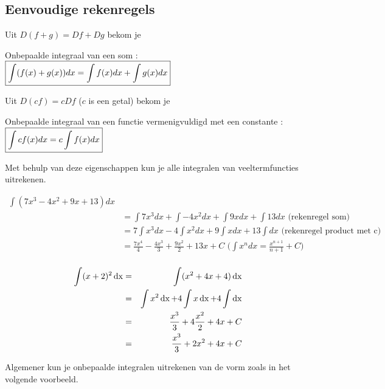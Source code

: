 \subsection{Eenvoudige rekenregels}

Uit $D(f+g)=Df+Dg$ bekom je

\begin{eigenschap} Onbepaalde integraal van een som : \\
	$\boxed { \int (f(x)+g(x))dx = \int f(x)dx + \int g(x)dx \hfill}$
\end{eigenschap}

Uit $D(cf)=cDf$ ($c$ is een getal) bekom je

\begin{eigenschap} Onbepaalde integraal van een functie vermenigvuldigd met een constante :\\
	$\boxed { \int cf(x)dx = c \int f(x)dx \hfill}$
\end{eigenschap}

Met behulp van deze eigenschappen kun je alle integralen van veeltermfuncties uitrekenen.

\begin{voorbeeld}
	\begin{equation*}
	\begin{split}
	\int (7x^3-4x^2+9x+13)dx\\
	&=\int 7x^3dx+\int -4x^2dx+\int 9xdx + \int 13dx \text{ (rekenregel som)}\\
	&= 7\int x^3dx -4 \int x^2dx+9\int xdx + 13 \int dx \text{ (rekenregel product met c)}\\
	&= \frac{7x^4}{4} -\frac{4x^3}{3} + \frac{9x^2}{2} +13 x+C \text{ ($\int x^n dx=\frac{x^{n+1}}{n+1}+C$)}\\
	\end{split}
	\end{equation*}
\end{voorbeeld}

\begin{voorbeeld} 
	\begin{eqnarray*}
	\int (x+2)^2 \operatorname{dx} &=& \int (x^2+4x+4)\operatorname{dx} \\
	&=& \int x^2 \operatorname{dx} + 4 \int x\operatorname{dx} +4 \int \operatorname{dx} \\
	&=& \frac{x^3}{3} + 4 \frac{x^2}{2} + 4x + C\\
	&=& \frac{x^3}{3} + 2 x^2 + 4x + C
	\end{eqnarray*}
\end{voorbeeld}

Algemener kun je onbepaalde integralen uitrekenen van de vorm zoals in het volgende voorbeeld.

